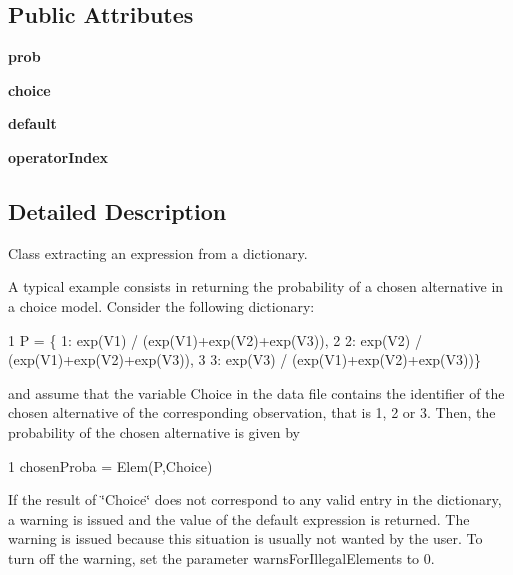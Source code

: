 \subsection*{Public Attributes}
\begin{DoxyCompactItemize}
\item 
{\bfseries prob}\hypertarget{classbio__expression_1_1_elem_a17c61b7da60297dbf7f4164a2a78aa49}{}\label{classbio__expression_1_1_elem_a17c61b7da60297dbf7f4164a2a78aa49}

\item 
{\bfseries choice}\hypertarget{classbio__expression_1_1_elem_a024d48dfc32b4486db3e0147bb57f2cf}{}\label{classbio__expression_1_1_elem_a024d48dfc32b4486db3e0147bb57f2cf}

\item 
{\bfseries default}\hypertarget{classbio__expression_1_1_elem_ae9652f5b42921e03b8623baf034e01be}{}\label{classbio__expression_1_1_elem_ae9652f5b42921e03b8623baf034e01be}

\item 
{\bfseries operator\+Index}\hypertarget{classbio__expression_1_1_elem_a862e4fd7b70af8a2bd3c0db048dc90a5}{}\label{classbio__expression_1_1_elem_a862e4fd7b70af8a2bd3c0db048dc90a5}

\end{DoxyCompactItemize}


\subsection{Detailed Description}
Class extracting an expression from a dictionary. 

A typical example consists in returning the probability of a chosen alternative in a choice model. Consider the following dictionary\+: 
\begin{DoxyCode}
1 P = \{  1: exp(V1) / (exp(V1)+exp(V2)+exp(V3)),
2 2: exp(V2) / (exp(V1)+exp(V2)+exp(V3)),
3 3: exp(V3) / (exp(V1)+exp(V2)+exp(V3))\}
\end{DoxyCode}
 and assume that the variable Choice in the data file contains the identifier of the chosen alternative of the corresponding observation, that is 1, 2 or 3. Then, the probability of the chosen alternative is given by 
\begin{DoxyCode}
1 chosenProba = Elem(P,Choice)
\end{DoxyCode}
 If the result of \char`\"{}\+Choice\char`\"{} does not correspond to any valid entry in the dictionary, a warning is issued and the value of the default expression is returned. The warning is issued because this situation is usually not wanted by the user. To turn off the warning, set the parameter warns\+For\+Illegal\+Elements to 0. 

